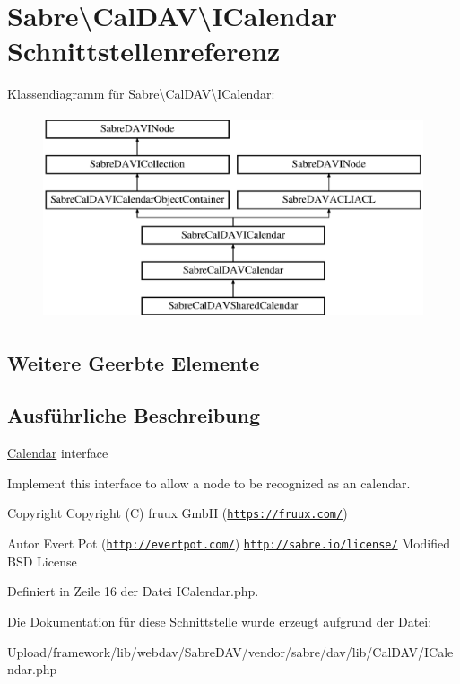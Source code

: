 \hypertarget{interface_sabre_1_1_cal_d_a_v_1_1_i_calendar}{}\section{Sabre\textbackslash{}Cal\+D\+AV\textbackslash{}I\+Calendar Schnittstellenreferenz}
\label{interface_sabre_1_1_cal_d_a_v_1_1_i_calendar}
Klassendiagramm für Sabre\textbackslash{}Cal\+D\+AV\textbackslash{}I\+Calendar\+:\begin{figure}[H]
\begin{center}
\leavevmode
\includegraphics[height=6.000000cm]{interface_sabre_1_1_cal_d_a_v_1_1_i_calendar}
\end{center}
\end{figure}
\subsection*{Weitere Geerbte Elemente}


\subsection{Ausführliche Beschreibung}
\mbox{\hyperlink{class_sabre_1_1_cal_d_a_v_1_1_calendar}{Calendar}} interface

Implement this interface to allow a node to be recognized as an calendar.

\begin{DoxyCopyright}{Copyright}
Copyright (C) fruux GmbH (\href{https://fruux.com/}{\tt https\+://fruux.\+com/}) 
\end{DoxyCopyright}
\begin{DoxyAuthor}{Autor}
Evert Pot (\href{http://evertpot.com/}{\tt http\+://evertpot.\+com/})  \href{http://sabre.io/license/}{\tt http\+://sabre.\+io/license/} Modified B\+SD License 
\end{DoxyAuthor}


Definiert in Zeile 16 der Datei I\+Calendar.\+php.



Die Dokumentation für diese Schnittstelle wurde erzeugt aufgrund der Datei\+:\begin{DoxyCompactItemize}
\item 
Upload/framework/lib/webdav/\+Sabre\+D\+A\+V/vendor/sabre/dav/lib/\+Cal\+D\+A\+V/I\+Calendar.\+php\end{DoxyCompactItemize}
